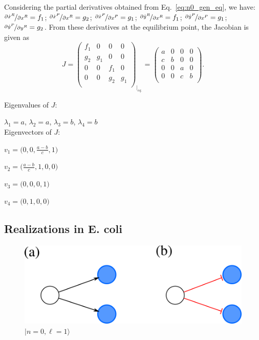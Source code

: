 \documentclass[12pt]{article}
\begin{document}
Considering the partial derivatives obtained from 
Eq.~\ref{eq:n0_gen_eq}, we have:
$\nicefrac{\partial \dot{x}^R}{\partial {x}^R} = f_1$;
$\nicefrac{\partial \dot{x}^P}{\partial {x}^R} = g_2$;
$\nicefrac{\partial \dot{x}^P}{\partial {x}^P} = g_1$;
$\nicefrac{\partial \dot{y}^R}{\partial {x}^R} = f_1$;
$\nicefrac{\partial \dot{y}^P}{\partial {x}^P} = g_1$;
$\nicefrac{\partial \dot{y}^P}{\partial {y}^R} = g_2$.
From these derivatives at the equilibrium point, the 
Jacobian is given as
\begin{equation}
    J = \begin{pmatrix}
        f_1 & 0 & 0 & 0 \\
        g_2 & g_1 & 0 & 0 \\
        0 & 0 & f_1 & 0 \\
        0 & 0 & g_2 & g_1 \\
    \end{pmatrix}_{\big|_{eq.}} =
    \begin{pmatrix}
        a & 0 & 0 & 0 \\
        c & b & 0 & 0 \\
        0 & 0 & a & 0 \\
        0 & 0 & c & b \\ 
    \end{pmatrix}.
\end{equation}

Eigenvalues of $J$:

$\lambda_1 = a$, $\lambda_2 = a$, $\lambda_3 = b$, 
$\lambda_4 = b$\\

Eigenvectors of $J$:

$ v_1 = \Big( 0, 0, \frac{a-b}{c}, 1 \Big)$

$ v_2 = \Big( \frac{a-b}{c}, 1, 0, 0 \Big)$

$ v_3 = \Big( 0, 0, 0, 1 \Big)$

$ v_4 = \Big( 0, 1, 0, 0 \Big)$

\subsection{Realizations in E. coli}

\begin{figure}[H]
    \centering
    \includegraphics[scale=0.5]{figs/n0l1_ecoli.png}
    \caption{$|n=0, \ell = 1\rangle$}
    \label{fig:fig1_l1}
\end{figure}
\end{document}
